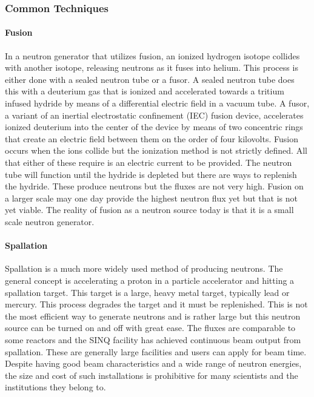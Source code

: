 \subsubsection{Common Techniques}

\paragraph{Fusion}
In a neutron generator that utilizes fusion, an ionized hydrogen isotope collides with another isotope, releasing neutrons as it fuses into helium. This process is either done with a sealed neutron tube or a fusor. A sealed neutron tube does this with a deuterium gas that is ionized and accelerated towards a tritium infused hydride by means of a differential electric field in a vacuum tube. A fusor, a variant of an inertial electrostatic confinement (IEC) fusion device, accelerates ionized deuterium into the center of the device by means of two concentric rings that create an electric field between them on the order of four kilovolts. Fusion occurs when the ions collide but the ionization method is not strictly defined. All that either of these require is an electric current to be provided. The neutron tube will function until the hydride is depleted but there are ways to replenish the hydride. These produce neutrons but the fluxes are not very high. Fusion on a larger scale may one day provide the highest neutron flux yet but that is not yet viable. The reality of fusion as a neutron source today is that it is a small scale neutron generator.

\paragraph{Spallation}
Spallation is a much more widely used method of producing neutrons. The general concept is accelerating a proton in a particle accelerator and hitting a spallation target. This target is a large, heavy metal target, typically lead or mercury. This process degrades the target and it must be replenished. This is not the most efficient way to generate neutrons and is rather large but this neutron source can be turned on and off with great ease. The fluxes are comparable to some reactors and the SINQ facility has achieved continuous beam output from spallation. These are generally large facilities and users can apply for beam time. Despite having good beam characteristics and a wide range of neutron energies, the size and cost of such installations is prohibitive for many scientists and the institutions they belong to.

